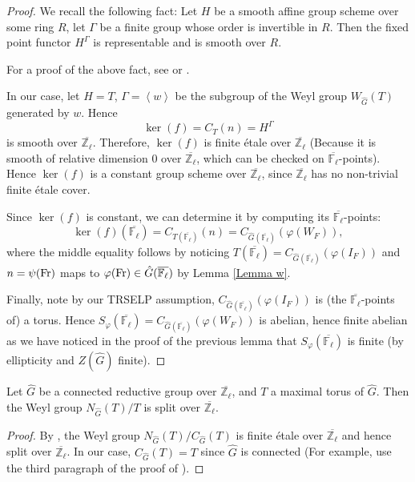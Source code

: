 \begin{proof}
	We recall the following fact: Let $H$ be a smooth affine group scheme over some ring $R$, let $\Gamma$ be a finite group whose order is invertible in $R$. Then the fixed point functor $H^{\Gamma}$ is representable and is smooth over $R$.
	
	For a proof of the above fact, see \cite[Proposition 3.4]{edixhoven1992neron} or \cite[Lemma A.1, A.13]{dhkm2020moduli}.
	
	In our case, let $H=T$, $\Gamma=\left<w\right>$ be the subgroup of the Weyl group $W_{\hat{G}}(T)$ generated by $w$. Hence $$\ker(f)=C_T(n)=H^{\Gamma}$$
    is smooth over $\overline{\mathbb{Z}_{\ell}}$. Therefore, $\ker(f)$ is finite étale over $\overline{\mathbb{Z}_{\ell}}$ (Because it is smooth of relative dimension $0$ over $\overline{\mathbb{Z}_{\ell}}$, which can be checked on $\overline{\mathbb{F}_{\ell}}$-points). Hence $\ker(f)$ is a constant group scheme over $\overline{\mathbb{Z}_{\ell}}$, since $\overline{\mathbb{Z}_{\ell}}$ has no non-trivial finite étale cover.
	
	Since $\ker(f)$ is constant, we can determine it by computing its $\overline{\mathbb{F}_{\ell}}$-points:
	\begin{equation}\label{Eq ker(f)}
	\ker(f)(\overline{\mathbb{F}_{\ell}})=C_{T(\overline{\mathbb{F}_{\ell}})}(n)=C_{\hat{G}(\overline{\mathbb{F}_{\ell}})}(\varphi(W_F)),
	\end{equation}
	where the middle equality follows by noticing $T(\overline{\mathbb{F}_{\ell}})=C_{\hat{G}(\overline{\mathbb{F}_{\ell}})}(\varphi(I_F))$ and $n=\psi(\operatorname{Fr})$ maps to $\varphi(\operatorname{Fr}) \in \hat{G}(\overline{\mathbb{F}_{\ell}})$ by Lemma \ref{Lemma w}.
	
	Finally, note by our TRSELP assumption, $C_{\hat{G}(\overline{\mathbb{F}_{\ell}})}(\varphi(I_F))$ is (the $\overline{\mathbb{F}_{\ell}}$-points of) a torus. Hence $S_{\varphi}(\overline{\mathbb{F}_{\ell}})=C_{\hat{G}(\overline{\mathbb{F}_{\ell}})}(\varphi(W_F))$ is abelian, hence finite abelian as we have noticed in the proof of the previous lemma that $S_\varphi(\overline{\mathbb{F}_{\ell}})$ is finite (by ellipticity and $Z(\hat{G})$ finite).
\end{proof}

\begin{lemma}\label{Lem Wely}
	Let $\hat{G}$ be a connected reductive group over $\overline{\mathbb{Z}_{\ell}}$, and $T$ a maximal torus of $\hat{G}$. Then the Weyl group $N_{\hat{G}}(T)/T$ is split over $\overline{\mathbb{Z}_{\ell}}$.
\end{lemma}

\begin{proof}
	By \cite[Proposition 3.2.8]{conrad2014reductive}, the Weyl group $N_{\hat{G}}(T)/C_{\hat{G}}(T)$ is finite étale over $\overline{\mathbb{Z}_{\ell}}$ and hence split over $\overline{\mathbb{Z}_{\ell}}$. In our case, $C_{\hat{G}}(T)=T$ since $\hat{G}$ is connected (For example, use the third paragraph of the proof of \cite[Proposition 3.1.12]{conrad2014reductive}).
\end{proof}
	

